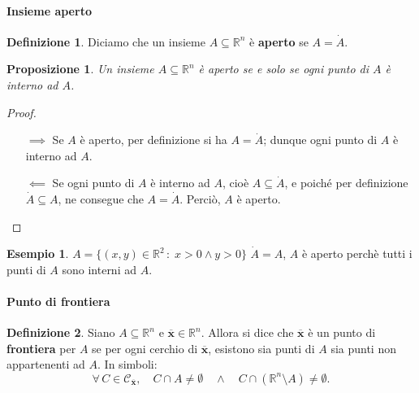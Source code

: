 \documentclass{article}
\theoremstyle{plain}
\newtheorem{prop}[thm]{Proposizione}
\theoremstyle{definition}
\newtheorem{defn}{Definizione}[section]
\newtheorem{exmp}{Esempio}[section]
\theoremstyle{remark}
\begin{document}
\vspace{10pt}

\paragraph{Insieme aperto}
\begin{bxthm}
\begin{defn}
    Diciamo che un insieme $A\subseteq\mathbb{R}^n$ è \textbf{aperto} se $A=\dot{A}$.
\end{defn}
\end{bxthm}

\vspace{10pt}

\begin{bxthm}
    \begin{prop}
    Un insieme $A\subseteq\mathbb{R}^n$ è aperto se e solo se ogni punto di $A$ è interno ad $A$.
    \end{prop}
\end{bxthm}
\begin{proof}\hfill
\begin{itemize}
    \item[$\implies$] Se $A$ è aperto, per definizione si ha $A=\dot{A}$; dunque ogni punto di $A$ è interno ad $A$.
    \item[$\impliedby$] Se ogni punto di $A$ è interno ad $A$, cioè $A\subseteq\dot{A}$, e poiché per definizione $\dot{A}\subseteq A$, ne consegue che $A=\dot{A}$. Perciò, $A$ è aperto.
\end{itemize}
\end{proof}

\vspace{10pt}

\begin{exmp}
    $A=\{(x,y)\in\mathbb{R}^2\,:\; x>0\land y>0\}$
    $\dot{A}=A$, $A$ è aperto perchè tutti i punti di $A$ sono interni ad $A$.
\end{exmp}

\vspace{10pt}

\paragraph{Punto di frontiera}
\begin{bxthm}
\begin{defn}
    Siano $A\subseteq\mathbb{R}^n$ e $\overline{\mathbf{x}}\in\mathbb{R}^n$.
    Allora si dice che $\overline{\mathbf{x}}$ è un punto di \textbf{frontiera} per $A$ se per ogni cerchio 
    di $\overline{\mathbf{x}}$, esistono sia punti di $A$ sia punti non appartenenti ad $A$.
    In simboli:
    \[
    \forall\, C\in\mathcal{C}_{\overline{\mathbf{x}}},\quad C\cap A\neq\emptyset \quad \land \quad C\cap (\mathbb{R}^n\setminus A)\neq\emptyset.
    \]
\end{defn}
\end{bxthm}
\end{document}
